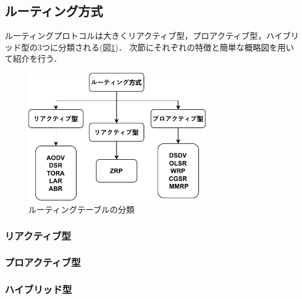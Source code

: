 \documentclass[a4paper, 11pt]{ltjsarticle}
\begin{document}
\subsection{ルーティング方式}
ルーティングプロトコルは大きくリアクティブ型，プロアクティブ型，ハイブリッド型の3つに分類される(図\ref{routing_classification})．
次節にそれぞれの特徴と簡単な概略図を用いて紹介を行う．
\begin{figure}[H]
  \centering
  \includegraphics[width=80mm]{classification_of_routing.pdf}
  \caption{ルーティングテーブルの分類}
  \label{routing_classification}
\end{figure}

\subsubsection{リアクティブ型}
\subsubsection{プロアクティブ型}
\subsubsection{ハイブリッド型}
\end{document}

